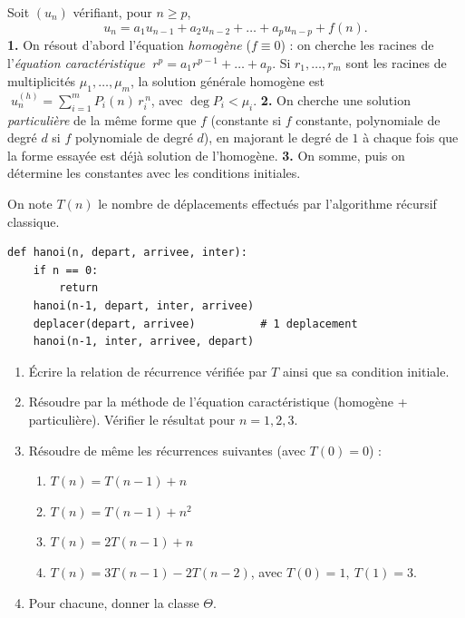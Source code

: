 \documentclass[11pt,a4paper]{article}
\begin{document}

\begin{rappel}
Soit $(u_n)$ vérifiant, pour $n\ge p$,
\[
  u_n = a_1 u_{n-1} + a_2 u_{n-2} + \dots + a_p u_{n-p} + f(n).
\]
\textbf{1.} On résout d'abord l'équation \emph{homogène} ($f\equiv0$) : on cherche les
racines de l'\emph{équation caractéristique}
$\;r^{p} = a_1 r^{p-1} + \dots + a_p$.
Si $r_1,\dots,r_m$ sont les racines de multiplicités $\mu_1,\dots,\mu_m$, la solution
générale homogène est
$\;u_n^{(h)} = \sum_{i=1}^{m} P_i(n)\, r_i^{\,n}$, avec $\deg P_i < \mu_i$.
\textbf{2.} On cherche une solution \emph{particulière} de la même forme que $f$
(constante si $f$ constante, polynomiale de degré $d$ si $f$ polynomiale de degré $d$),
en majorant le degré de $1$ à chaque fois que la forme essayée est déjà solution de
l'homogène.
\textbf{3.} On somme, puis on détermine les constantes avec les conditions initiales.
\end{rappel}

On note $T(n)$ le nombre de déplacements effectués par l'algorithme récursif classique.
\begin{lstlisting}
def hanoi(n, depart, arrivee, inter):
    if n == 0:
        return
    hanoi(n-1, depart, inter, arrivee)
    deplacer(depart, arrivee)          # 1 deplacement
    hanoi(n-1, inter, arrivee, depart)
\end{lstlisting}

\begin{enumerate}[label=\arabic*.,leftmargin=*]
  \item Écrire la relation de récurrence vérifiée par $T$ ainsi que sa condition initiale.
  \item Résoudre par la méthode de l'équation caractéristique (homogène + particulière).
        Vérifier le résultat pour $n=1,2,3$.
  \item Résoudre de même les récurrences suivantes (avec $T(0)=0$) :
        \begin{enumerate}[label=(\alph*)]
          \item $T(n) = T(n-1) + n$
          \item $T(n) = T(n-1) + n^2$
          \item $T(n) = 2T(n-1) + n$
          \item $T(n) = 3T(n-1) - 2T(n-2)$, avec $T(0)=1,\ T(1)=3$.
        \end{enumerate}
  \item Pour chacune, donner la classe $\Theta$.
\end{enumerate}
\end{document}
